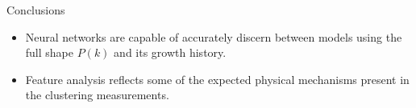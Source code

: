 \begin{block}{Conclusions}
  \begin{itemize}
    \item Neural networks are capable of accurately discern between models using the full shape $P(k)$ and its growth history.
    \item Feature analysis reflects some of the expected physical mechanisms present in the clustering measurements.
  \end{itemize}

\end{block}